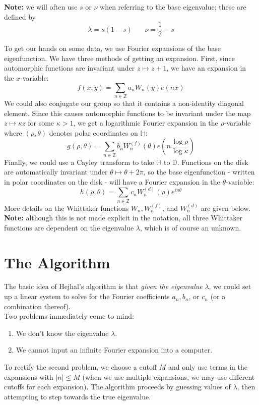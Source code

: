 \documentclass[]{article}
\begin{document}
\textbf{Note:} we will often use $s$ or $\nu$ when referring to the base eigenvalue; these are defined by
$$
\lambda = s(1 - s) ~~~~~~~~ \nu = \frac{1}{2} - s
$$

To get our hands on some data, we use Fourier expansions of the base eigenfunction.
We have three methods of getting an expansion.
First, since automorphic functions are invariant under $z \mapsto z + 1$, we have an expansion in the $x$-variable:
$$
f(x, y) = \sum_{n \in \mathbb{Z}}a_nW_n(y)e(nx)
$$
We could also conjugate our group so that it contains a non-identity diagonal element.
Since this causes automorphic functions to be invariant under the map $z \mapsto \kappa z$ for some $\kappa > 1$, we get a logarithmic Fourier expansion in the $\rho$-variable where $(\rho, \theta)$ denotes polar coordinates on $\mathbb{H}$:
$$
g(\rho, \theta) = \sum_{n \in \mathbb{Z}}b_nW_n^{(f)}(\theta)e\left( n\frac{\log\rho}{\log\kappa} \right)
$$
Finally, we could use a Cayley transform to take $\mathbb{H}$ to $\mathbb{D}$.
Functions on the disk are automatically invariant under $\theta \mapsto \theta + 2\pi$, so the base eigenfunction - written in polar coordinates on the disk - will have a Fourier expansion in the $\theta$-variable:
$$
h(\rho, \theta) = \sum_{n \in \mathbb{Z}}c_nW_n^{(d)}(\rho)e^{in\theta}
$$
More details on the Whittaker functions $W_n, W_n^{(f)}$, and $W_n^{(d)}$ are given below.
\\

\textbf{Note:} although this is not made explicit in the notation, all three Whittaker functions are dependent on the eigenvalue $\lambda$, which is of course an unknown.

\section*{The Algorithm}

The basic idea of Hejhal's algorithm is that \textit{given the eigenvalue} $\lambda$, we could set up a linear system to solve for the Fourier coefficients $a_n, b_n$, or $c_n$ (or a combination thereof).
\\

Two problems immediately come to mind:
\begin{enumerate}
	\item We don't know the eigenvalue $\lambda$.
	\item We cannot input an infinite Fourier expansion into a computer.
\end{enumerate}
To rectify the second problem, we choose a cutoff $M$ and only use terms in the expansions with $|n| \leq M$ (when we use multiple expansions, we may use different cutoffs for each expansion).
The algorithm proceeds by guessing values of $\lambda$, then attempting to step towards the true eigenvalue.
\end{document}
